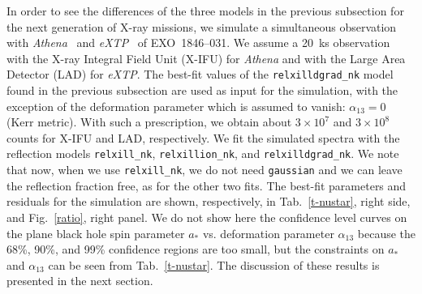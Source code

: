\documentclass[twocolumn]{emulateapj}
\begin{document}
In order to see the differences of the three models in the previous subsection for the next generation of X-ray missions, we simulate a simultaneous observation with \textsl{Athena}~\citep{2013arXiv1306.2307N} and \textsl{eXTP}~\citep{2016SPIE.9905E..1QZ} of EXO~1846--031. We assume a 20~ks observation with the X-ray Integral Field Unit (X-IFU) for \textsl{Athena} and with the Large Area Detector (LAD) for \textsl{eXTP}. The best-fit values of the {\tt relxilldgrad\_nk} model found in the previous subsection are used as input for the simulation, with the exception of the deformation parameter which is assumed to vanish: $\alpha_{13} = 0$ (Kerr metric). With such a prescription, we obtain about $3\times 10^7$ and $3\times 10^8$ counts for X-IFU and LAD, respectively. We fit the simulated spectra with the reflection models {\tt relxill\_nk}, {\tt relxillion\_nk}, and {\tt relxilldgrad\_nk}. We note that now, when we use {\tt relxill\_nk}, we do not need {\tt gaussian} and we can leave the reflection fraction free, as for the other two fits. The best-fit parameters and residuals for the simulation are shown, respectively, in Tab.~\ref{t-nustar}, right side, and Fig.~\ref{ratio}, right panel. We do not show here the confidence level curves on the plane black hole spin parameter $a_*$ vs. deformation parameter $\alpha_{13}$ because the 68\%, 90\%, and 99\% confidence regions are too small, but the constraints on $a_*$ and $\alpha_{13}$ can be seen from Tab.~\ref{t-nustar}. The discussion of these results is presented in the next section.
\end{document}
